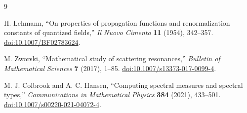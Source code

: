 \documentclass[11pt]{article}
\begin{document}
\begin{thebibliography}{9}

H. Lehmann,
``On properties of propagation functions and renormalization constants of quantized fields,''
\emph{Il Nuovo Cimento} \textbf{11} (1954), 342--357.
\href{https://doi.org/10.1007/BF02783624}{doi:10.1007/BF02783624}.

M. Zworski,
``Mathematical study of scattering resonances,''
\emph{Bulletin of Mathematical Sciences} \textbf{7} (2017), 1--85.
\href{https://doi.org/10.1007/s13373-017-0099-4}{doi:10.1007/s13373-017-0099-4}.

M. J. Colbrook and A. C. Hansen,
``Computing spectral measures and spectral types,''
\emph{Communications in Mathematical Physics} \textbf{384} (2021), 433--501.
\href{https://doi.org/10.1007/s00220-021-04072-4}{doi:10.1007/s00220-021-04072-4}.

\end{thebibliography}
\end{document}
